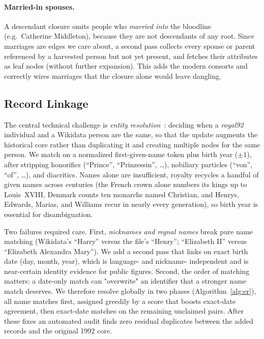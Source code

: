 \paragraph{Married-in spouses.}
A descendant closure omits people who \emph{married into} the bloodline (e.g.\
Catherine Middleton), because they are not descendants of any root. Since marriages
are edges we care about, a second pass collects every spouse or parent referenced
by a harvested person but not yet present, and fetches their attributes as leaf
nodes (without further expansion). This adds the modern consorts and correctly
wires marriages that the closure alone would leave dangling.

\subsection{Record Linkage}
\label{sub:linkage}

The central technical challenge is \emph{entity resolution}~\cite{getoor2012entity,christen2012data}: deciding when a
\emph{royal92} individual and a Wikidata person are the same, so that the update
augments the historical core rather than duplicating it and creating multiple nodes for the same person. We match on a normalized
first-given-name token plus birth year ($\pm 1$), after stripping honorifics
(``Prince'', ``Prinzessin'', \dots), nobiliary particles (``von'', ``of'', \dots),
and diacritics. Names alone are insufficient, royalty recycles a handful of given names across
centuries (the French crown alone numbers its kings up to Louis~XVIII, Denmark
counts ten monarchs named Christian, and Henrys, Edwards, Marias, and Williams
recur in nearly every generation), so birth year is essential for
disambiguation.


Two failures required care. First, \emph{nicknames and regnal names} break
pure name matching (Wikidata's ``Harry'' versus the file's ``Henry''; ``Elizabeth
II'' versus ``Elizabeth Alexandra Mary''). We add a second pass that links on
exact birth date (day, month, year), which is language- and nickname-
independent and is near-certain identity evidence for public figures. Second, the
order of matching matters: a date-only match can "overwrite" an identifier that a
stronger name match deserves. We therefore resolve globally in two phases (Algorithm~\ref{alg:er}), all
name matches first, assigned greedily by a score that boosts exact-date agreement,
then exact-date matches on the remaining unclaimed pairs. After these fixes an
automated audit finds zero residual duplicates between the added records
and the original 1992 core.

